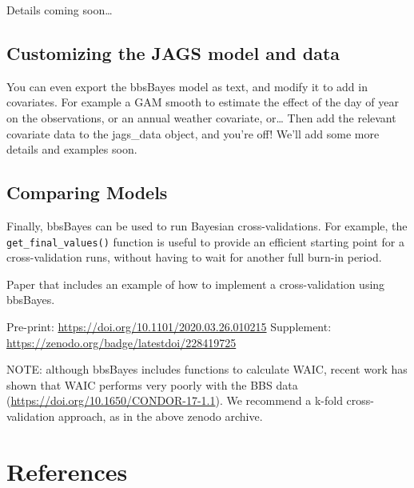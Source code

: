 \documentclass[
]{book}
\begin{document}
Details coming soon\ldots{}

\hypertarget{customizing-the-jags-model-and-data}{%
\section{Customizing the JAGS model and data}\label{customizing-the-jags-model-and-data}}

You can even export the bbsBayes model as text, and modify it to add in covariates. For example a GAM smooth to estimate the effect of the day of year on the observations, or an annual weather covariate, or\ldots{} Then add the relevant covariate data to the jags\_data object, and you're off! We'll add some more details and examples soon.

\hypertarget{comparing-models}{%
\section{Comparing Models}\label{comparing-models}}

Finally, bbsBayes can be used to run Bayesian cross-validations. For example, the \texttt{get\_final\_values()} function is useful to provide an efficient starting point for a cross-validation runs, without having to wait for another full burn-in period.

Paper that includes an example of how to implement a cross-validation using bbsBayes.

Pre-print: \url{https://doi.org/10.1101/2020.03.26.010215}
Supplement: \url{https://zenodo.org/badge/latestdoi/228419725}

NOTE: although bbsBayes includes functions to calculate WAIC, recent work has shown that WAIC performs very poorly with the BBS data (\url{https://doi.org/10.1650/CONDOR-17-1.1}). We recommend a k-fold cross-validation approach, as in the above zenodo archive.

\hypertarget{Ref}{%
\chapter{References}\label{Ref}}
\end{document}
